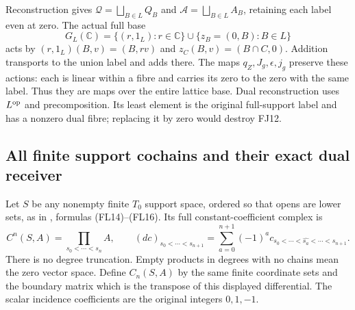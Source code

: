 \documentclass[11pt,a4paper]{article}
\theoremstyle{definition}\newtheorem{definition}[theorem]{Definition}
\newcommand{\C}{\mathbb C}\newcommand{\R}{\mathbb R}
\begin{document}
Reconstruction gives $\mathcal Q=\bigsqcup_{B\in L}Q_B$ and
$\mathcal A=\bigsqcup_{B\in L}A_B$, retaining each label even at zero.
The actual full base
\[
 G_L(\C)=\{(r,1_L):r\in\C\}\cup\{z_B=(0,B):B\in L\}
 \tag{FJ13}
\]
acts by $(r,1_L)(B,v)=(B,rv)$ and
$z_C(B,v)=(B\cap C,0)$. Addition transports to the union label
and adds there. The maps $q_Z,J_g,\epsilon,j_g$ preserve these actions:
each is linear within a fibre and carries its zero to the zero with
the same label. Thus they are maps over the entire lattice base.
Dual reconstruction uses $L^{\rm op}$ and precomposition. Its least
element is the original full-support label and has a nonzero dual
fibre; replacing it by zero would destroy FJ12.

\subsection{All finite support cochains and their exact dual receiver}
Let $S$ be any nonempty finite $T_0$ support space, ordered so that
opens are lower sets, as in \cite{FJsupport}, formulas
(FL14)--(FL16). Its full constant-coefficient complex is
\[
 C^n(S,A)=\prod_{s_0<\cdots<s_n}A,\qquad
 (dc)_{s_0<\cdots<s_{n+1}}
   =\sum_{a=0}^{n+1}(-1)^ac_{s_0<\cdots<\widehat{s_a}<\cdots<s_{n+1}}.
 \tag{FJ14}\label{fj:fj:support}
\]
There is no degree truncation. Empty products in degrees with no
chains mean the zero vector space. Define $C_n(S,A)$ by the same
finite coordinate sets and the boundary matrix which is the transpose
of this displayed differential. The scalar incidence coefficients
are the original integers $0,1,-1$.
\end{document}
